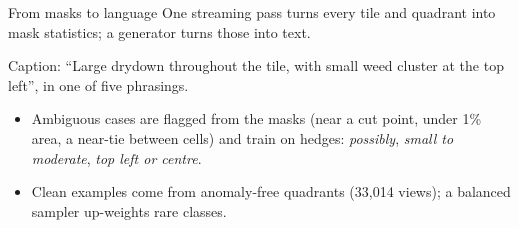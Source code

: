 \documentclass[aspectratio=169,10pt,t]{beamer}
\begin{document}
\begin{frame}{From masks to language}
One streaming pass turns every tile and quadrant into mask statistics; a generator turns those into text.
\medskip
{}

\medskip
Caption: ``Large drydown throughout the tile, with small weed cluster at the top left'', in one of five phrasings.
\medskip
\begin{itemize}
\item Ambiguous cases are flagged from the masks (near a cut point, under 1\% area, a near-tie between cells) and train on hedges: \emph{possibly}, \emph{small to moderate}, \emph{top left or centre}.
\item Clean examples come from anomaly-free quadrants (33,014 views); a balanced sampler up-weights rare classes.
\end{itemize}
\end{frame}
\end{document}
